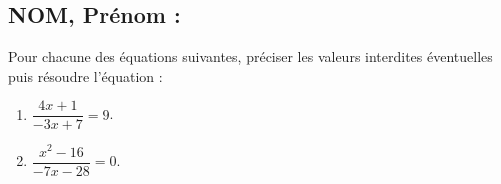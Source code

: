 \documentclass[a4paper,11pt,exos]{nsi}
\begin{document}
\subsection*{NOM, Prénom : \dotfill} 


\maketitle



\begin{exercice}
    Pour chacune des équations suivantes, préciser les valeurs interdites éventuelles puis résoudre l'équation :
    \begin{multicols}{3}
        \begin{enumerate}
            \item $\dfrac{4x+1}{-3x+7}=9$.
	        \item $\dfrac{x^2-16}{-7x-28}=0$.
        \end{enumerate}
    \end{multicols}
    
\end{exercice}

\end{document}
